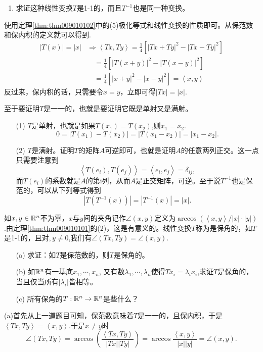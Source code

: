 \begin{problemset}
\begin{enumerate}
\item 求证这种线性变换$T$是1-1的，而且$T^{-1}$也是同一种变换。

\end{enumerate}

使用定理\ref{thm:thm009010102}中的(5)极化等式和线性变换的性质即可。从保范数和保内积的定义就可以得到.
\[
\begin{aligned}
|T(x)| = |x| &\Rightarrow \left<Tx,Ty\right> = \frac{1}{4}[|Tx + Ty|^2 - |Tx-Ty|^2] \\
&\quad = \frac{1}{4}[|T(x+y)|^2 - |T(x-y)|^2] \\
&\quad = \frac{1}{4}[|x+y|^2 - |x-y|^2] = \left<x,y\right>
\end{aligned}
\]
反过来，保内积的话，只需要令$x = y$，立即可得$|Tx| = |x|$.

至于要证明$T$是一一的，也就是要证明它既是单射又是满射。
\begin{enumerate}
\item[(1)]$T$是单射，也就是如果$T(x_1) = T(x_2)$,则$x_1 = x_2$.
\[
0 = |T(x_1) - T(x_2)| = |T(x_1 - x_2)| = |x_1 - x_2|.
\]
\item[(2)]$T$是满射。证明$T$的矩阵$A$可逆即可，也就是证明$A$的任意两列正交。这一点只需要注意到
\[
\left<T(e_i),T(e_j)\right> = \left<e_i, e_j\right> = \delta_{ij},
\]
而$T(e_i)$的系数就是$A$的第i列，从而$A$是正交矩阵，可逆。至于说$T^{-1}$也是保范的，可以从下列等式得到
\[
|T(T^{-1}(x))| = |T^{-1}(x)| = |x|.
\]
\end{enumerate}


\item 如$x, y \in \mathbb{R}^n$不为零，$x$与$y$间的夹角记作$\angle{(x, y)}$定义为$\arccos(\left<x, y\right>/|x|\cdot|y|)$.由定理\ref{thm:thm009010101}的(2)，这是有意义的。线性变换$T$称为是保角的，如$T$是1-1的，且对$, y \neq 0$,我们有$\angle(Tx, Ty) = \angle(x, y)$.
\begin{enumerate}
\item[(a)] 求证：如$T$是保范数的，则$T$是保角的。

\item[(b)] 如$\mathbb{R}^n$有一基底$x_1, \cdots, x_n$, 又有数$\lambda_1, \cdots, \lambda_n$使得$Tx_i = \lambda_ix_i$,求证$T$是保角的，当且仅当所有$|\lambda_i|$皆相等。

\item[(c)] 所有保角的$T: \mathbb{R}^n \to \mathbb{R}^n$是些什么？
\end{enumerate}

(a)首先从上一道题目可知，保范数意味着$T$是一一的，且保内积，于是$\left<Tx,Ty\right>=\left<x,y\right>$.于是$x \neq y$时
\[
\angle(Tx, Ty) = \arccos{(\frac{\left<Tx, Ty\right>}{|Tx||Ty|})} = \arccos{\frac{\left<x,y\right>}{|x||y|}} = \angle(x, y).
\]


\end{problemset}
